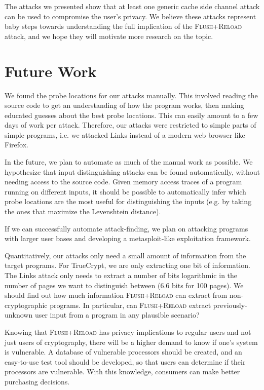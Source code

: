 \documentclass{acm_proc_article-sp}
\begin{document}
The attacks we presented show that at least one generic cache side channel
attack can be used to compromise the user's privacy. We believe these attacks
represent baby steps towards understanding the full implication of the
\textsc{Flush+Reload} attack, and we hope they will motivate more research on
the topic.

\section{Future Work}
\label{sec:future}

We found the probe locations for our attacks manually. This involved reading the
source code to get an understanding of how the program works, then making
educated guesses about the best probe locations. This can easily amount to a few
days of work per attack. Therefore, our attacks were restricted to simple parts
of simple programs, i.e. we attacked Links instead of a modern web browser like
Firefox.

In the future, we plan to automate as much of the manual work as possible. We
hypothesize that input distinguishing attacks can be found automatically,
without needing access to the source code. Given memory access traces of
a program running on different inputs, it should be possible to automatically
infer which probe locations are the most useful for distinguishing the inputs
(e.g. by taking the ones that maximize the Levenshtein distance).

If we can successfully automate attack-finding, we plan on attacking programs
with larger user bases and developing a metasploit-like exploitation framework.

Quantitatively, our attacks only need a small amount of information from the
target programs. For TrueCrypt, we are only extracting one bit of information.
The Links attack only needs to extract a number of bits logarithmic in the
number of pages we want to distinguish between (6.6 bits for 100 pages). We
should find out how much information \textsc{Flush+Reload} can extract from
non-cryptographic programs. In particular, can \textsc{Flush+Reload} extract
previously-unknown user input from a program in any plausible scenario?

Knowing that \textsc{Flush+Reload} has privacy implications to regular users and
not just users of cryptography, there will be a higher demand to know if one's
system is vulnerable. A database of vulnerable processors should be created, and
an easy-to-use test tool should be developed, so that users can determine if
their processors are vulnerable. With this knowledge, consumers can make better
purchasing decisions.
\end{document}

